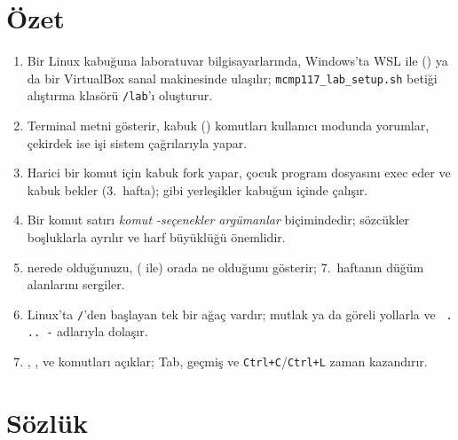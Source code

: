 \section{Özet}

\begin{keyidea}
\begin{enumerate}[leftmargin=1.4em]
  \item Bir Linux kabuğuna laboratuvar bilgisayarlarında, Windows'ta WSL ile () ya da bir VirtualBox sanal makinesinde ulaşılır; \texttt{mcmp117\_lab\_setup.sh} betiği alıştırma klasörü \texttt{\tl/lab}'ı oluşturur.
  \item Terminal metni gösterir, kabuk () komutları kullanıcı modunda yorumlar, çekirdek ise işi sistem çağrılarıyla yapar.
  \item Harici bir komut için kabuk fork yapar, çocuk program dosyasını exec eder ve kabuk bekler (3.\ hafta);  gibi yerleşikler kabuğun içinde çalışır.
  \item Bir komut satırı \emph{komut -seçenekler argümanlar} biçimindedir; sözcükler boşluklarla ayrılır ve harf büyüklüğü önemlidir.
  \item {} nerede olduğunuzu,  ( ile) orada ne olduğunu gösterir;  7.\ haftanın düğüm alanlarını sergiler.
  \item Linux'ta \texttt{/}'den başlayan tek bir ağaç vardır;  mutlak ya da göreli yollarla ve \texttt{\tl\ . .. -} adlarıyla dolaşır.
  \item {}, ,  ve  komutları açıklar; Tab, geçmiş ve \texttt{Ctrl+C}/\texttt{Ctrl+L} zaman kazandırır.
\end{enumerate}
\end{keyidea}

\section{Sözlük}

